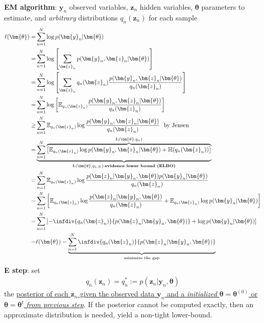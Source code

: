 \textbf{EM algorithm}: $\bm{y}_n$ observed variables, $\bm{z}_n$ hidden variables, $\bm{\theta}$ parameters to estimate, 
and \textit{arbitrary} distributions $q_n(\bm{z}_n)$ for each sample
\begin{align}
    \ell(\bm{\theta})
    =& \sum_{n=1}^N\log{p(\bm{y}_n|\bm{\theta})} \\
    =& \sum_{n=1}^N\log\left[\sum_{\bm{z}_n}p(\bm{y}_n,\bm{z}_n|\bm{\theta})\right] \\
    =& \sum_{n=1}^N\log\left[\sum_{\bm{z}_n}q_n(\bm{z}_n)\frac{p(\bm{y}_n,\bm{z}_n|\bm{\theta})}{q_n(\bm{z}_n)}\right] \\
    =& \sum_{n=1}^N\log\left[\mathbb{E}_{q_n(\bm{z}_n)}\frac{p(\bm{y}_n,\bm{z}_n|\bm{\theta})}{q_n(\bm{z}_n)}\right] \\
    \geq& \sum_{n=1}^N\mathbb{E}_{q_n(\bm{z}_n)}\log\frac{p(\bm{y}_n,\bm{z}_n|\bm{\theta})}{q_n(\bm{z}_n)}~~\text{by Jensen} \\
    =& \underbrace{\sum_{n=1}^N\overbrace{
        \left[\mathbb{E}_{q_n(\bm{z}_n)}\log p(\bm{y}_n,\bm{z}_n|\bm{\theta})+\mathbb{H}(q_n(\bm{z}_n))\right]
    }^{\text{\L}(\bm{\theta},q_n)}}_{\text{\L}(\bm{\theta},q_{1:N})\text{:\textbf{evidence lower bound (ELBO)}}} \\
    =& \sum_{n=1}^N\mathbb{E}_{q_n(\bm{z}_n)}\log\frac{p(\bm{z}_n|\bm{y}_n,\bm{\theta})p(\bm{y}_n|\bm{\theta})}{q_n(\bm{z}_n)} \\
    =& \sum_{n=1}^N\left[
        \mathbb{E}_{q_n(\bm{z}_n)}\log\frac{p(\bm{z}_n|\bm{y}_n,\bm{\theta})}{q_n(\bm{z}_n)} 
        + \mathbb{E}_{q_n(\bm{z}_n)}\log p(\bm{y}_n|\bm{\theta})
    \right] \\
    =& \sum_{n=1}^N\left[
        -\infdiv{q_n(\bm{z}_n)}{p(\bm{z}_n|\bm{y}_n,\bm{\theta})} + \log p(\bm{y}_n|\bm{\theta})
    \right] \\
    =& \ell(\bm{\theta}) - \underbrace{\sum_{n=1}^N\infdiv{q_n(\bm{z}_n)}{p(\bm{z}_n|\bm{y}_n,\bm{\theta})}}_{\text{minimize the gap}}
\end{align}
\textbf{E step}: 
set 
\begin{gather}
    q_n(\bm{z}_n)=q_n^*:=p(\bm{z}_n|\bm{y}_n,\bm{\theta})
\end{gather} 
the \uline{posterior of each $\bm{z}_{n}$
given the observed data $\bm{y}_n$ and a \textit{initialized} $\bm{\theta}=\bm{\theta}^{(0)}$ or $\bm{\theta}=\bm{\theta}^{t}$ \textit{from previous step}}.
If the posterior cannot be computed exactly, then an approximate distribution is needed, yield a non-tight lower-bound.\\
